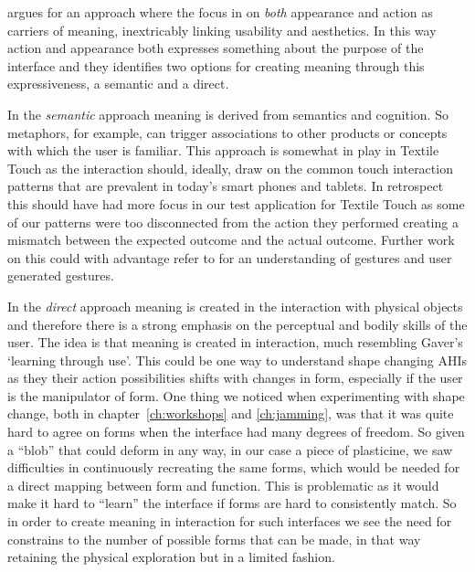 \citeauthor{djajadiningrat2004tangible} argues for an approach where the focus in on \emph{both} appearance and action as carriers of meaning, inextricably linking usability and aesthetics.
In this way action and appearance both expresses something about the purpose of the interface and they identifies two options for creating meaning through this expressiveness, a semantic and a direct.

In the \emph{semantic} approach meaning is derived from semantics and cognition.
So metaphors, for example, can trigger associations to other products or concepts with which the user is familiar.
This approach is somewhat in play in Textile Touch as the interaction should, ideally, draw on the common touch interaction patterns that are prevalent in today's smart phones and tablets.
In retrospect this should have had more focus in our test application for Textile Touch as some of our patterns were too disconnected from the action they performed creating a mismatch between the expected outcome and the actual outcome.
Further work on this could with advantage refer to \citep{wobbrock2009user,morris2010understanding} for an understanding of gestures and user generated gestures.

In the \emph{direct} approach meaning is created in the interaction with physical objects and therefore there is a strong emphasis on the perceptual and bodily skills of the user.
The idea is that meaning is created in interaction, much resembling Gaver's `learning through use'. 
This could be one way to understand shape changing AHIs as they their action possibilities shifts with changes in form, especially if the user is the manipulator of form.
One thing we noticed when experimenting with shape change, both in chapter~\ref{ch:workshops} and \ref{ch:jamming}, was that it was quite hard to agree on forms when the interface had many degrees of freedom.
So given a ``blob'' that could deform in any way, in our case a piece of plasticine, we saw difficulties in continuously recreating the same forms, which would be needed for a direct mapping between form and function.
This is problematic as it would make it hard to ``learn'' the interface if forms are hard to consistently match.
So in order to create meaning in interaction for such interfaces we see the need for constrains to the number of possible forms that can be made, in that way retaining the physical exploration but in a limited fashion.

